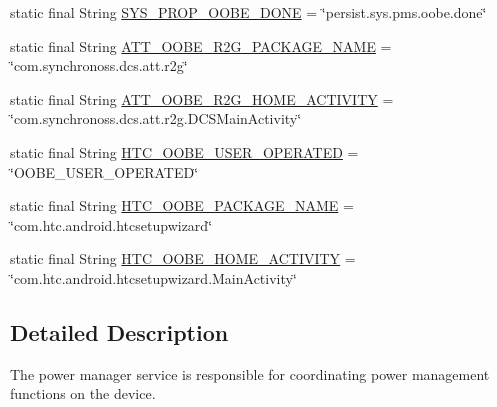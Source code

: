 \begin{DoxyCompactItemize}
static final String \hyperlink{classcom_1_1android_1_1server_1_1power_1_1PowerManagerService_abf417d30561cbdea1adfc17a70d79585}{S\-Y\-S\-\_\-\-P\-R\-O\-P\-\_\-\-O\-O\-B\-E\-\_\-\-D\-O\-N\-E} = \char`\"{}persist.\-sys.\-pms.\-oobe.\-done\char`\"{}
\item 
static final String \hyperlink{classcom_1_1android_1_1server_1_1power_1_1PowerManagerService_acdbd9e6decd07ab218922d663801febf}{A\-T\-T\-\_\-\-O\-O\-B\-E\-\_\-\-R2\-G\-\_\-\-P\-A\-C\-K\-A\-G\-E\-\_\-\-N\-A\-M\-E} = \char`\"{}com.\-synchronoss.\-dcs.\-att.\-r2g\char`\"{}
\item 
static final String \hyperlink{classcom_1_1android_1_1server_1_1power_1_1PowerManagerService_aa2d86f6f85417baeb1a3d69f58b1b6bd}{A\-T\-T\-\_\-\-O\-O\-B\-E\-\_\-\-R2\-G\-\_\-\-H\-O\-M\-E\-\_\-\-A\-C\-T\-I\-V\-I\-T\-Y} = \char`\"{}com.\-synchronoss.\-dcs.\-att.\-r2g.\-D\-C\-S\-Main\-Activity\char`\"{}
\item 
static final String \hyperlink{classcom_1_1android_1_1server_1_1power_1_1PowerManagerService_aff27485cc3b261fecf8b915684856218}{H\-T\-C\-\_\-\-O\-O\-B\-E\-\_\-\-U\-S\-E\-R\-\_\-\-O\-P\-E\-R\-A\-T\-E\-D} = \char`\"{}O\-O\-B\-E\-\_\-\-U\-S\-E\-R\-\_\-\-O\-P\-E\-R\-A\-T\-E\-D\char`\"{}
\item 
static final String \hyperlink{classcom_1_1android_1_1server_1_1power_1_1PowerManagerService_a6fb69ddcb606d60c55ffc060b36c2881}{H\-T\-C\-\_\-\-O\-O\-B\-E\-\_\-\-P\-A\-C\-K\-A\-G\-E\-\_\-\-N\-A\-M\-E} = \char`\"{}com.\-htc.\-android.\-htcsetupwizard\char`\"{}
\item 
static final String \hyperlink{classcom_1_1android_1_1server_1_1power_1_1PowerManagerService_a008f9d09a8914ed201b6783a06cd5cd1}{H\-T\-C\-\_\-\-O\-O\-B\-E\-\_\-\-H\-O\-M\-E\-\_\-\-A\-C\-T\-I\-V\-I\-T\-Y} = \char`\"{}com.\-htc.\-android.\-htcsetupwizard.\-Main\-Activity\char`\"{}
\end{DoxyCompactItemize}


\subsection{Detailed Description}
The power manager service is responsible for coordinating power management functions on the device. 

